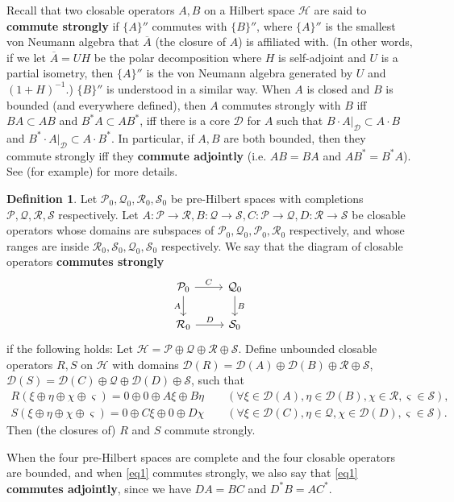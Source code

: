 \documentclass[11pt,b5paper,notitlepage]{article}
\theoremstyle{definition}
\newtheorem{df}{Definition}[section]
\theoremstyle{plain}
\newcommand{\mc}{\mathcal}
\newcommand{\ovl}{\overline}
\newcommand{\Dom}{\scr D}
\newcommand{\scr}{\mathscr}
\numberwithin{equation}{section}
\begin{document}
Recall that two closable operators $A,B$ on a Hilbert space $\mc H$ are said to \textbf{commute strongly} if $\{A\}''$ commutes with $\{B\}''$, where $\{A\}''$ is the smallest von Neumann algebra that $\ovl A$ (the closure of $A$) is affiliated with. (In other words, if we let $\ovl A=UH$ be the polar decomposition where $H$ is self-adjoint and $U$ is a partial isometry, then $\{A\}''$ is the von Neumann algebra generated by $U$ and $(1+H)^{-1}$.) $\{B\}''$ is understood in a similar way. When $A$ is closed and $B$ is bounded (and everywhere defined), then $A$ commutes strongly with $B$ iff $BA\subset AB$ and $B^*A\subset AB^*$, iff there is a core $\scr D$ for $A$ such that $B\cdot A|_{\scr D}\subset A\cdot B$ and $B^*\cdot A|_\Dom\subset A\cdot B^*$. In particular, if $A,B$ are both bounded, then they commute strongly iff they \textbf{commute adjointly} (i.e. $AB=BA$ and $AB^*=B^*A$). See (for example) \cite[Sec. 1.A]{Gui20}  for more details. 

\begin{df}
Let $\mc P_0,\mc Q_0, \mc R_0,\mc S_0$ be pre-Hilbert spaces with completions $\mc P,\mc Q,\mc R,\mc S$ respectively. Let  $A:\mc P\rightarrow\mc R,B:\mc Q\rightarrow\mc S,C:\mc P\rightarrow\mc Q,D:\mc R\rightarrow\mc S$ be closable operators whose domains are subspaces of $\mc P_0,\mc Q_0, \mc P_0,\mc R_0$ respectively, and whose ranges are inside $\mc R_0,\mc S_0,\mc Q_0,\mc S_0$ respectively. We say that the diagram of closable operators 	\textbf{commutes strongly}
\begin{equation}\label{eq1}
\begin{tikzcd}
\mc P_0 \arrow[r,"C"] \arrow[d,"A"'] & \mc Q_0 \arrow[d,"B"] \\
\mc R_0 \arrow[r,"D"]           & \mc S_0        
\end{tikzcd}
\end{equation}
if the following holds: Let $\mc H=\mc P\oplus\mc Q\oplus\mc R\oplus\mc S$. Define unbounded closable operators $R,S$ on $\mc H$ with domains $\Dom(R)=\Dom(A)\oplus\Dom(B)\oplus\mc R\oplus \mc S$, $\Dom(S)=\Dom(C)\oplus\mc Q\oplus\Dom(D)\oplus \mc S$, such that
	\begin{gather*}
	R(\xi\oplus\eta\oplus\chi\oplus\varsigma)=0\oplus 0\oplus A\xi\oplus B\eta\qquad(\forall \xi\in\Dom(A),\eta\in\Dom(B),\chi\in\mc R,\varsigma\in \mc S),\\
	S(\xi\oplus\eta\oplus\chi\oplus\varsigma)=0\oplus C\xi\oplus 0\oplus D\chi   \qquad(\forall \xi\in\Dom(C),\eta\in\mc Q,\chi\in \Dom(D),\varsigma\in\mc S).
	\end{gather*}
Then (the closures of) $R$ and $S$ commute strongly.

When the four pre-Hilbert spaces are complete and the four closable operators are bounded, and when \eqref{eq1} commutes strongly, we also say that \eqref{eq1} \textbf{commutes adjointly}, since we have $DA=BC$ and $D^*B=AC^*$.
\end{df}
\end{document}
